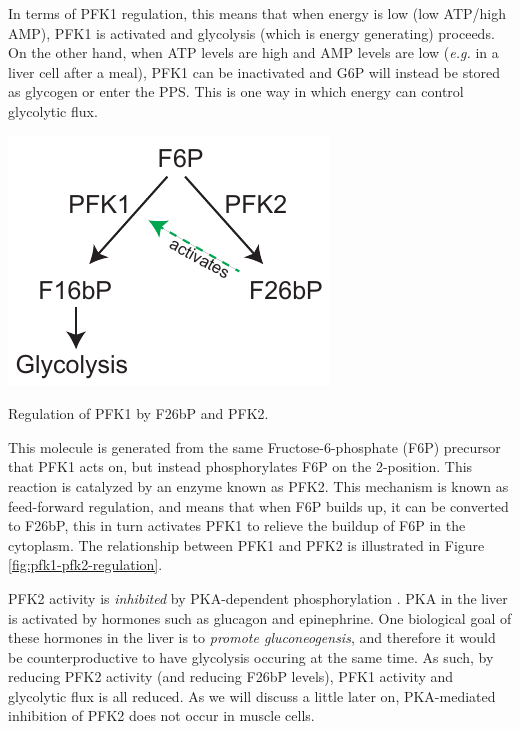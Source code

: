 \documentclass{tufte-handout}
\begin{document}
  In terms of PFK1 regulation, this means that when energy is low (low ATP/high AMP), PFK1 is activated and glycolysis (which is energy generating) proceeds.  On the other hand, when ATP levels are high and AMP levels are low (\textit{e.g.} in a liver cell after a meal), PFK1 can be inactivated and G6P will instead be stored as glycogen or enter the PPS.  This is one way in which energy can control glycolytic flux.

\begin{marginfigure}
\includegraphics{figures/pfk1-pfk2-regulation.pdf}
\caption{Regulation of PFK1 by F26bP and PFK2.}
\label{fig:pfk1-pfk2-regulation}
\end{marginfigure}

  This molecule is generated from the same Fructose-6-phosphate (F6P) precursor that PFK1 acts on, but instead phosphorylates F6P on the 2-position.  This reaction is catalyzed by an enzyme known as PFK2.  This mechanism is known as feed-forward regulation, and means that when F6P builds up, it can be converted to F26bP, this in turn activates PFK1 to relieve the buildup of F6P in the cytoplasm.  The relationship between PFK1 and PFK2 is illustrated in Figure \ref{fig:pfk1-pfk2-regulation}.

  PFK2 activity is \emph{inhibited} by PKA-dependent phosphorylation \citep{VanSchaftingen1981}.  PKA in the liver is activated by hormones such as glucagon and epinephrine.  One biological goal of these hormones in the liver is to \emph{promote gluconeogensis}, and therefore it would be counterproductive to have glycolysis occuring at the same time.  As such, by reducing PFK2 activity (and reducing F26bP levels), PFK1 activity and glycolytic flux is all reduced.  As we will discuss a little later on, PKA-mediated inhibition of PFK2 does not occur in muscle cells.
\end{document}
